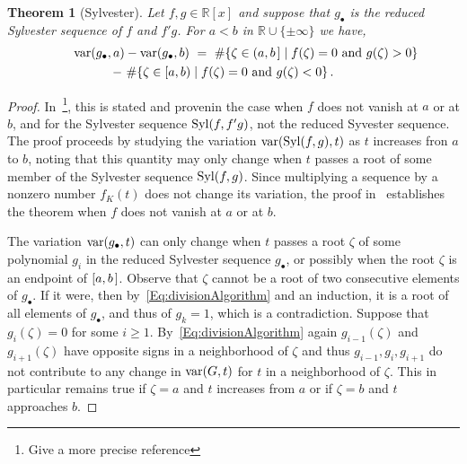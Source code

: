 \documentclass[12pt]{amsart}
\newtheorem{theorem}{Theorem}
\theoremstyle{definition}
\newcommand{\RR}{\mathbb{R}}
\DeclareMathOperator{\var}{{\rm var}}
\DeclareMathOperator{\Syl}{{\rm Syl}}
\begin{document}
\begin{theorem}[Sylvester]
  \label{Th:Sylvester}
  Let $f,g\in\RR[x]$ and suppose that $g_\bullet$ is the reduced Sylvester sequence of $f$ and $f'g$.
  For $a<b$ in $\RR\cup\{\pm\infty\}$ we have,
  \begin{multline*}
    \qquad\var(g_\bullet,a)-\var(g_\bullet,b)\ =\
    \#\{\zeta\in(a,b\hspace{.05cm}]\mid f(\zeta)=0\mbox{ and } g(\zeta)>0\}\\
      \ -\
    \#\{\zeta\in[a,b)\mid f(\zeta)=0\mbox{ and } g(\zeta)<0\}\,.\qquad
  \end{multline*}
\end{theorem}
\begin{proof}
  In~\cite{BCR}\footnote{Give a more precise reference}, this is stated and provenin the case when $f$ does not vanish at $a$ or at $b$,
  and for the Sylvester sequence $\Syl(f,f'g)$, not the reduced Syvester sequence.
  The proof proceeds by studying the variation $\var(\Syl(f,g), t)$ as $t$ increases fron $a$ to $b$, noting that this quantity may only
  change when $t$ passes a root of some member of the Sylvester sequence $\Syl(f,g)$.
  Since multiplying a sequence by a nonzero number $f_K(t)$ does not change its variation, the proof in~\cite{BCR} establishes the theorem
  when $f$ does not vanish at $a$ or at $b$.

  The variation $\var(g_\bullet,t)$ can only change when $t$ passes a root $\zeta$ of some polynomial $g_i$ in the reduced Sylvester
  sequence $g_\bullet$, or possibly when the
  root $\zeta$ is an   endpoint of $[a,b\hspace{.05cm}]$.
  Observe that $\zeta$ cannot be a root of two consecutive elements of $g_\bullet$.
  If it were, then by~\eqref{Eq:divisionAlgorithm} and an induction, it is a root of all elements of $g_\bullet$, and thus of $g_k=1$, which is a
  contradiction.
  Suppose that $g_i(\zeta)=0$ for some $i\geq 1$.
  By~\eqref{Eq:divisionAlgorithm} again $g_{i-1}(\zeta)$ and $g_{i+1}(\zeta)$ have opposite signs in a neighborhood of $\zeta$ and thus
  $g_{i-1},g_i,g_{i+1}$ do not contribute to any change in $\var(G,t)$ for $t$ in a neighborhood of $\zeta$.
  This in particular remains true if $\zeta=a$ and $t$ increases from $a$ or if $\zeta=b$ and $t$ approaches $b$.


 \end{proof}
\end{document}
